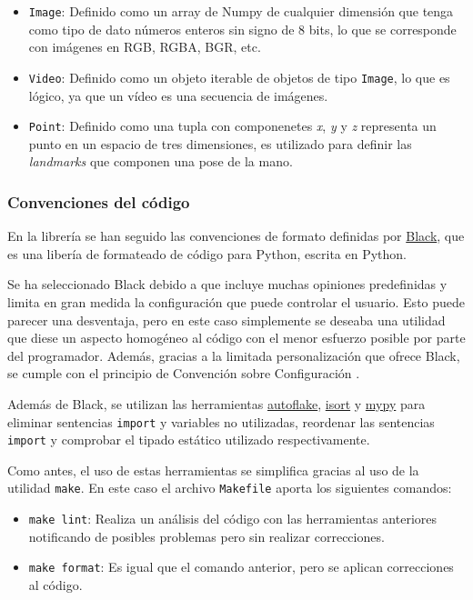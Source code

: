 \begin{itemize}
    \item \texttt{Image}: Definido como un array de Numpy de cualquier dimensión
    que tenga como tipo de dato números enteros sin signo de 8 bits, lo que se
    corresponde con imágenes en RGB, RGBA, BGR, etc.
    \item \texttt{Video}: Definido como un objeto iterable de objetos de tipo
    \texttt{Image}, lo que es lógico, ya que un vídeo es una secuencia de
    imágenes.
    \item \texttt{Point}: Definido como una tupla con componenetes \textit{x},
    \textit{y} y \textit{z} representa un punto en un espacio de tres
    dimensiones, es utilizado para definir las \textit{landmarks} que componen
    una pose de la mano.
\end{itemize}

\subsubsection{Convenciones del código}

En la librería se han seguido las convenciones de formato definidas por
\href{https://github.com/psf/black}{Black}, que es una libería de formateado de
código para Python, escrita en Python.

Se ha seleccionado Black debido a que incluye muchas opiniones predefinidas y
limita en gran medida la configuración que puede controlar el usuario. Esto
puede parecer una desventaja, pero en este caso simplemente se deseaba una
utilidad que diese un aspecto homogéneo al código con el menor esfuerzo posible
por parte del programador. Además, gracias a la limitada personalización que
ofrece Black, se cumple con el principio de Convención sobre Configuración
\cite{eswiki:125269135}.

Además de Black, se utilizan las herramientas
\href{https://github.com/PyCQA/autoflake}{autoflake},
\href{https://github.com/PyCQA/isort}{isort} y
\href{https://github.com/python/mypy}{mypy} para eliminar sentencias
\texttt{import} y variables no utilizadas, reordenar las sentencias
\texttt{import} y comprobar el tipado estático utilizado respectivamente.

Como antes, el uso de estas herramientas se simplifica gracias al uso de la
utilidad \texttt{make}. En este caso el archivo \texttt{Makefile} aporta los
siguientes comandos:

\begin{itemize}
    \item \texttt{make lint}: Realiza un análisis del código con las
    herramientas anteriores notificando de posibles problemas pero sin realizar
    correcciones.
    \item \texttt{make format}: Es igual que el comando anterior, pero se
    aplican correcciones al código.
\end{itemize}

